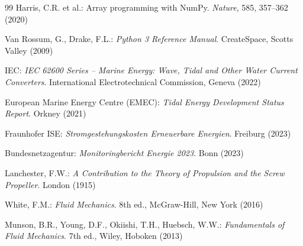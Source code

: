 ﻿\documentclass[a4paper,12pt]{article}
\theoremstyle{definition}
\begin{document}
\begin{thebibliography}{99}
Harris, C.R. et al.:
Array programming with NumPy.
\textit{Nature}, 585, 357--362 (2020)

Van Rossum, G., Drake, F.L.:
\textit{Python 3 Reference Manual}.
CreateSpace, Scotts Valley (2009)

IEC:
\textit{IEC 62600 Series -- Marine Energy: Wave, Tidal and Other Water Current Converters}.
International Electrotechnical Commission, Geneva (2022)

European Marine Energy Centre (EMEC):
\textit{Tidal Energy Development Status Report}.
Orkney (2021)

Fraunhofer ISE:
\textit{Stromgestehungskosten Erneuerbare Energien}.
Freiburg (2023)

Bundesnetzagentur:
\textit{Monitoringbericht Energie 2023}.
Bonn (2023)

Lanchester, F.W.:
\textit{A Contribution to the Theory of Propulsion and the Screw Propeller}.
London (1915)

White, F.M.:
\textit{Fluid Mechanics}.
8th ed., McGraw-Hill, New York (2016)

Munson, B.R., Young, D.F., Okiishi, T.H., Huebsch, W.W.:
\textit{Fundamentals of Fluid Mechanics}.
7th ed., Wiley, Hoboken (2013)

\end{thebibliography}
\end{document}
